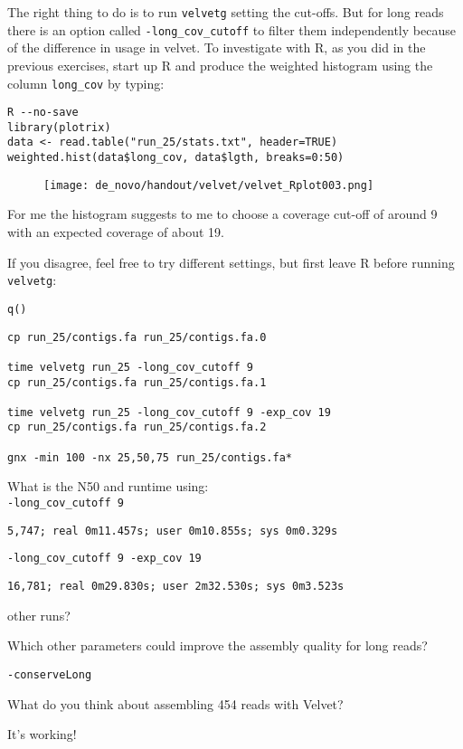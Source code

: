 \begin{steps}
The right thing to do is to run \texttt{velvetg} setting the cut-offs. But for long reads
there is an option called \texttt{-long\_cov\_cutoff} to filter them
independently because of the difference in usage in velvet. To investigate with
R, as you did in the previous exercises, start up R and produce the weighted
histogram using the column \texttt{long\_cov} by typing:
\begin{lstlisting}[style=R]
R --no-save
library(plotrix) 
data <- read.table("run_25/stats.txt", header=TRUE) 
weighted.hist(data$long_cov, data$lgth, breaks=0:50)
\end{lstlisting}

\begin{figure}[H]
\centering
\texttt{[image: de\_novo/handout/velvet/velvet\_Rplot003.png]}
\caption{\label{fig:velvetRplot003}}
\end{figure}

For me the histogram suggests to me to choose a coverage cut-off of around 9
with an expected coverage of about 19.

If you disagree, feel free to try different settings, but first leave R before
running \texttt{velvetg}:
\begin{lstlisting}[style=R]
q()
\end{lstlisting}

\begin{lstlisting}
cp run_25/contigs.fa run_25/contigs.fa.0

time velvetg run_25 -long_cov_cutoff 9
cp run_25/contigs.fa run_25/contigs.fa.1

time velvetg run_25 -long_cov_cutoff 9 -exp_cov 19
cp run_25/contigs.fa run_25/contigs.fa.2

gnx -min 100 -nx 25,50,75 run_25/contigs.fa*
\end{lstlisting}

\end{steps}

\begin{questions}
What is the N50 and runtime using:\\
\texttt{-long\_cov\_cutoff 9}
\begin{answer}
\texttt{5,747; real  0m11.457s; user  0m10.855s; sys  0m0.329s}
\end{answer}

\texttt{-long\_cov\_cutoff 9 -exp\_cov 19}
\begin{answer}
\texttt{16,781; real 0m29.830s; user 2m32.530s; sys 0m3.523s}
\end{answer}

other runs?

Which other parameters could improve the assembly quality for long reads?
\begin{answer}
\texttt{-conserveLong}
\end{answer}

What do you think about assembling 454 reads with Velvet?
\begin{answer}
It's working!
\end{answer}
\end{questions}
